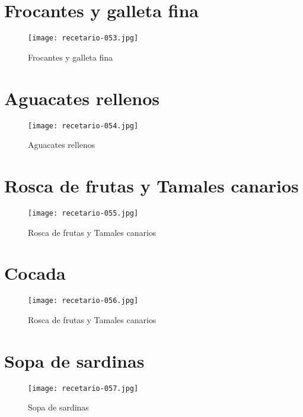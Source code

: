 \documentclass[12pt,letterpaper]{article}
\begin{document}
\newpage

\section{Frocantes y galleta fina}
  \begin{figure}[H]
    \vspace{2pt}
  \texttt{[image: recetario-053.jpg]}
    \caption{Frocantes y galleta fina}
    
  \end{figure}

\newpage

\section{Aguacates rellenos}
  \begin{figure}[H]
    \vspace{2pt}
  \texttt{[image: recetario-054.jpg]}
    \caption{Aguacates rellenos}
    
  \end{figure}

\newpage

\section{Rosca de frutas y Tamales canarios}
  \begin{figure}[H]
    \vspace{2pt}
  \texttt{[image: recetario-055.jpg]}
    \caption{Rosca de frutas y Tamales canarios}
    
  \end{figure}


\newpage

\section{Cocada}
  \begin{figure}[H]
    \vspace{2pt}
  \texttt{[image: recetario-056.jpg]}
    \caption{Rosca de frutas y Tamales canarios}
    
  \end{figure}

\newpage

\section{Sopa de sardinas}
  \begin{figure}[H]
    \vspace{2pt}
  \texttt{[image: recetario-057.jpg]}
    \caption{Sopa de sardinas}
    
  \end{figure}
\end{document}
